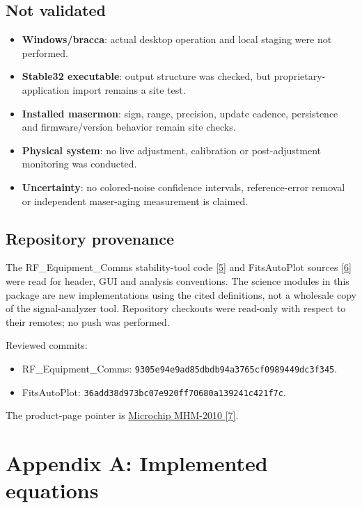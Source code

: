 \documentclass[11pt,a4paper]{article}
\begin{document}
\subsection{Not validated}
\begin{itemize}
\item \textbf{Windows/bracca}: actual desktop operation and local staging were not performed.
\item \textbf{Stable32 executable}: output structure was checked, but proprietary-application import remains a site test.
\item \textbf{Installed masermon}: sign, range, precision, update cadence, persistence and firmware/version behavior remain site checks.
\item \textbf{Physical system}: no live adjustment, calibration or post-adjustment monitoring was conducted.
\item \textbf{Uncertainty}: no colored-noise confidence intervals, reference-error removal or independent maser-aging measurement is claimed.
\end{itemize}

\subsection{Repository provenance}
The RF\_Equipment\_Comms stability-tool code
\href{https://github.com/Braveheart53/RF_Equipment_Comms/tree/main/sa_stability_tool}{[5]}
and FitsAutoPlot sources \href{https://github.com/Braveheart53/FitsAutoPlot}{[6]}
were read for header, GUI and analysis conventions. The science modules in this package
are new implementations using the cited definitions, not a wholesale copy of
the signal-analyzer tool. Repository checkouts were read-only with respect
to their remotes; no push was performed.

Reviewed commits:
\begin{itemize}
\item RF\_Equipment\_Comms: \texttt{9305e94e9ad85dbdb94a3765cf0989449dc3f345}.
\item FitsAutoPlot: \texttt{36add38d973bc07e920ff70680a139241c421f7c}.
\end{itemize}
The product-page pointer is
\href{https://www.microchip.com/en-us/product/mhm-2010}{Microchip MHM-2010 [7]}.
\clearpage

\section{Appendix A: Implemented equations}
\end{document}
